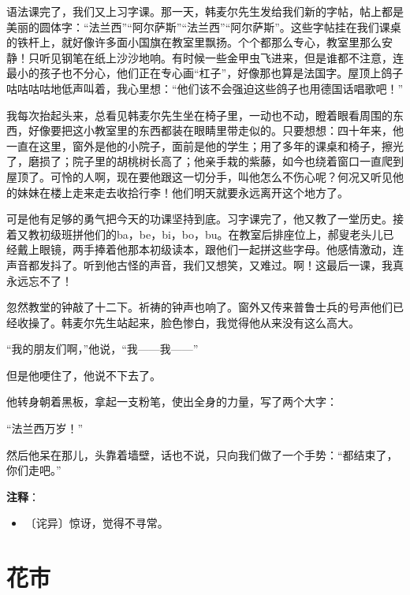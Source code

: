 \documentclass[12pt,UTF-8,openany]{ctexbook}
\begin{document}
\begin{normalsize}
    语法课完了，我们又上习字课。那一天，韩麦尔先生发给我们新的字帖，帖上都是美丽的圆体字：“法兰西”“阿尔萨斯”“法兰西”“阿尔萨斯”。这些字帖挂在我们课桌的铁杆上，就好像许多面小国旗在教室里飘扬。个个都那么专心，教室里那么安静！只听见钢笔在纸上沙沙地响。有时候一些金甲虫飞进来，但是谁都不注意，连最小的孩子也不分心，他们正在专心画“杠子”，好像那也算是法国字。屋顶上鸽子咕咕咕咕地低声叫着，我心里想：“他们该不会强迫这些鸽子也用德国话唱歌吧！”
    
    我每次抬起头来，总看见韩麦尔先生坐在椅子里，一动也不动，瞪着眼看周围的东西，好像要把这小教室里的东西都装在眼睛里带走似的。只要想想：四十年来，他一直在这里，窗外是他的小院子，面前是他的学生；用了多年的课桌和椅子，擦光了，磨损了；院子里的胡桃树长高了；他亲手栽的紫藤，如今也绕着窗口一直爬到屋顶了。可怜的人啊，现在要他跟这一切分手，叫他怎么不伤心呢？何况又听见他的妹妹在楼上走来走去收拾行李！他们明天就要永远离开这个地方了。
    
    可是他有足够的勇气把今天的功课坚持到底。习字课完了，他又教了一堂历史。接着又教初级班拼他们的ba，be，bi，bo，bu。在教室后排座位上，郝叟老头儿已经戴上眼镜，两手捧着他那本初级读本，跟他们一起拼这些字母。他感情激动，连声音都发抖了。听到他古怪的声音，我们又想笑，又难过。啊！这最后一课，我真永远忘不了！
    
    忽然教堂的钟敲了十二下。祈祷的钟声也响了。窗外又传来普鲁士兵的号声他们已经收操了。韩麦尔先生站起来，脸色惨白，我觉得他从来没有这么高大。
    
    “我的朋友们啊，”他说，“我——我——”
    
    但是他哽住了，他说不下去了。
    
    他转身朝着黑板，拿起一支粉笔，使出全身的力量，写了两个大字：
    
    “法兰西万岁！”
    
    然后他呆在那儿，头靠着墙壁，话也不说，只向我们做了一个手势：“都结束了，你们走吧。”
    
\end{normalsize}


\newpage

\textbf{注释}：

\vspace{-1em}

\begin{itemize}
    \setlength\itemsep{-0.2em}
    \item 〔诧异〕惊讶，觉得不寻常。
\end{itemize}

\chapter{花市}
\end{document}
